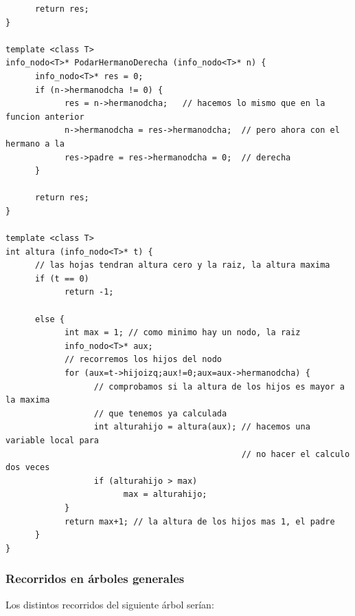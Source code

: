 \documentclass[10pt,a4paper,spanish]{report}
\begin{document}
\begin{verbatim}
      return res;
}

template <class T>
info_nodo<T>* PodarHermanoDerecha (info_nodo<T>* n) {
      info_nodo<T>* res = 0;
      if (n->hermanodcha != 0) {
            res = n->hermanodcha;   // hacemos lo mismo que en la funcion anterior
            n->hermanodcha = res->hermanodcha;  // pero ahora con el hermano a la
            res->padre = res->hermanodcha = 0;  // derecha
      }

      return res;
}

template <class T>
int altura (info_nodo<T>* t) {
      // las hojas tendran altura cero y la raiz, la altura maxima
      if (t == 0)
            return -1;

      else {
            int max = 1; // como minimo hay un nodo, la raiz
            info_nodo<T>* aux;
            // recorremos los hijos del nodo
            for (aux=t->hijoizq;aux!=0;aux=aux->hermanodcha) {
                  // comprobamos si la altura de los hijos es mayor a la maxima
                  // que tenemos ya calculada
                  int alturahijo = altura(aux); // hacemos una variable local para
                                                // no hacer el calculo dos veces
                  if (alturahijo > max)
                        max = alturahijo;
            }
            return max+1; // la altura de los hijos mas 1, el padre
      }
}
\end{verbatim}

\subsubsection{\textcolor[rgb]{0.3,0.4,0.8}Recorridos en árboles generales}
\noindent
Los distintos recorridos del siguiente árbol serían:
\end{document}
